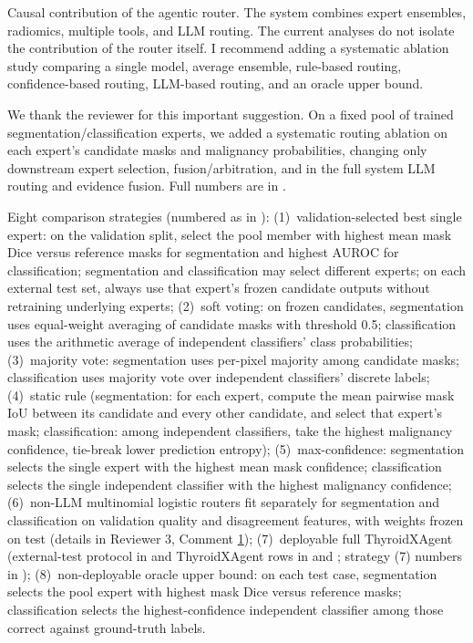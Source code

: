 \label{rev:R1.2}
\begin{reviewercomment}
Causal contribution of the agentic router. The system combines expert ensembles, radiomics, multiple tools, and LLM routing. The current analyses do not isolate the contribution of the router itself. I recommend adding a systematic ablation study comparing a single model, average ensemble, rule-based routing, confidence-based routing, LLM-based routing, and an oracle upper bound.
\end{reviewercomment}
\begin{authorresponse}
We thank the reviewer for this important suggestion. On a fixed pool of trained segmentation/classification experts, we added a systematic routing ablation on each expert's candidate masks and malignancy probabilities, changing only downstream expert selection, fusion/arbitration, and in the full system LLM routing and evidence fusion. Full numbers are in .\par
Eight comparison strategies (numbered as in ): (1)~validation-selected best single expert: on the validation split, select the pool member with highest mean mask Dice versus reference masks for segmentation and highest AUROC for classification; segmentation and classification may select different experts; on each external test set, always use that expert's frozen candidate outputs without retraining underlying experts; (2)~soft voting: on frozen candidates, segmentation uses equal-weight averaging of candidate masks with threshold 0.5; classification uses the arithmetic average of independent classifiers' class probabilities; (3)~majority vote: segmentation uses per-pixel majority among candidate masks; classification uses majority vote over independent classifiers' discrete labels; (4)~static rule (segmentation: for each expert, compute the mean pairwise mask IoU between its candidate and every other candidate, and select that expert's mask; classification: among independent classifiers, take the highest malignancy confidence, tie-break lower prediction entropy); (5)~max-confidence: segmentation selects the single expert with the highest mean mask confidence; classification selects the single independent classifier with the highest malignancy confidence; (6)~non-LLM multinomial logistic routers fit separately for segmentation and classification on validation quality and disagreement features, with weights frozen on test (details in Reviewer 3, Comment \hyperref[rev:R3.1]{1}); (7)~deployable full ThyroidXAgent (external-test protocol in  and ThyroidXAgent rows in  and ; strategy (7) numbers in ); (8)~non-deployable oracle upper bound: on each test case, segmentation selects the pool expert with highest mask Dice versus reference masks; classification selects the highest-confidence independent classifier among those correct against ground-truth labels.\par

\end{authorresponse}
